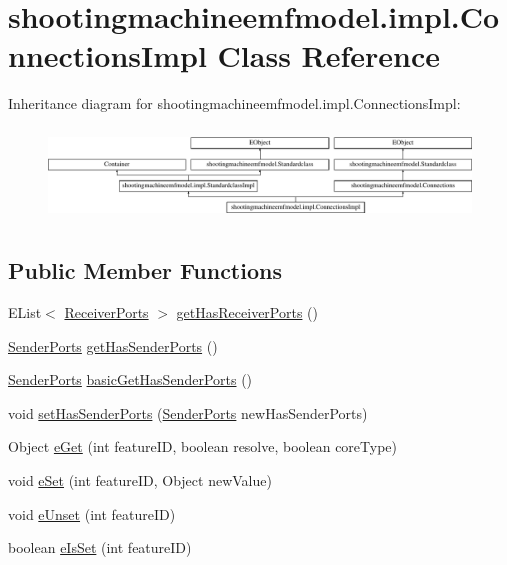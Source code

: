 \hypertarget{classshootingmachineemfmodel_1_1impl_1_1_connections_impl}{\section{shootingmachineemfmodel.\-impl.\-Connections\-Impl Class Reference}
\label{classshootingmachineemfmodel_1_1impl_1_1_connections_impl}
}
Inheritance diagram for shootingmachineemfmodel.\-impl.\-Connections\-Impl\-:\begin{figure}[H]
\begin{center}
\leavevmode
\includegraphics[height=2.497213cm]{classshootingmachineemfmodel_1_1impl_1_1_connections_impl}
\end{center}
\end{figure}
\subsection*{Public Member Functions}
\begin{DoxyCompactItemize}
\item 
E\-List$<$ \hyperlink{interfaceshootingmachineemfmodel_1_1_receiver_ports}{Receiver\-Ports} $>$ \hyperlink{classshootingmachineemfmodel_1_1impl_1_1_connections_impl_a103b66052688de23b26b3aab450c0cec}{get\-Has\-Receiver\-Ports} ()
\item 
\hyperlink{interfaceshootingmachineemfmodel_1_1_sender_ports}{Sender\-Ports} \hyperlink{classshootingmachineemfmodel_1_1impl_1_1_connections_impl_ae75288578dc15b4f66454ee96b23ed0b}{get\-Has\-Sender\-Ports} ()
\item 
\hyperlink{interfaceshootingmachineemfmodel_1_1_sender_ports}{Sender\-Ports} \hyperlink{classshootingmachineemfmodel_1_1impl_1_1_connections_impl_a5aef0b0cc3fd6b3213dfb3760931b178}{basic\-Get\-Has\-Sender\-Ports} ()
\item 
void \hyperlink{classshootingmachineemfmodel_1_1impl_1_1_connections_impl_aeb7d9ce00a37e1731f7ecb90756fdeea}{set\-Has\-Sender\-Ports} (\hyperlink{interfaceshootingmachineemfmodel_1_1_sender_ports}{Sender\-Ports} new\-Has\-Sender\-Ports)
\item 
Object \hyperlink{classshootingmachineemfmodel_1_1impl_1_1_connections_impl_afb26f0f7415aa96dff9bc4cc057da2e4}{e\-Get} (int feature\-I\-D, boolean resolve, boolean core\-Type)
\item 
void \hyperlink{classshootingmachineemfmodel_1_1impl_1_1_connections_impl_a9c93203a49629f3a93da43c33466d82c}{e\-Set} (int feature\-I\-D, Object new\-Value)
\item 
void \hyperlink{classshootingmachineemfmodel_1_1impl_1_1_connections_impl_a5623dc259ba2a2b748fb4ffb55a0cf6b}{e\-Unset} (int feature\-I\-D)
\item 
boolean \hyperlink{classshootingmachineemfmodel_1_1impl_1_1_connections_impl_acc40dbef7ab631b39be1768c316e98d1}{e\-Is\-Set} (int feature\-I\-D)
\end{DoxyCompactItemize}
